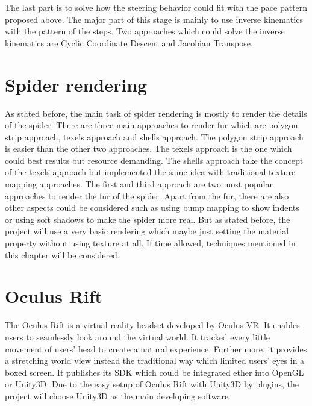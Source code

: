 The last part is to solve how the steering behavior could fit with the pace pattern proposed above. The major part of this stage is mainly to use inverse kinematics with the pattern of the steps. Two approaches which could solve the inverse kinematics are Cyclic Coordinate Descent and Jacobian Transpose.
\section{Spider rendering}
As stated before, the main task of spider rendering is mostly to render the details of the spider. There are three main approaches to render fur which are polygon strip approach, texels approach and shells approach\cite{fur}. The polygon strip approach is easier than the other two approaches. The texels approach is the one which could best results but resource demanding. The shells approach take the concept of the texels approach but implemented the same idea with traditional texture mapping approaches\cite{fur}. The first and third approach are two most popular approaches to render the fur of the spider. Apart from the fur, there are also other aspects could be considered such as using bump mapping to show indents or using soft shadows to make the spider more real. But as stated before, the project will use a very basic rendering which maybe just setting the material property without using texture at all. If time allowed, techniques mentioned in this chapter will be considered.
\section{Oculus Rift}
The Oculus Rift is a virtual reality headset developed by Oculus VR. It enables users to seamlessly look around the virtual world. It tracked every little movement of users' head to create a natural experience. Further more, it provides a stretching world view instead the traditional way which limited users' eyes in a boxed screen.
It publishes its SDK which could be integrated ether into OpenGL or Unity3D. Due to the easy setup of Oculus Rift with Unity3D by plugins, the project will choose Unity3D as the main developing software.
